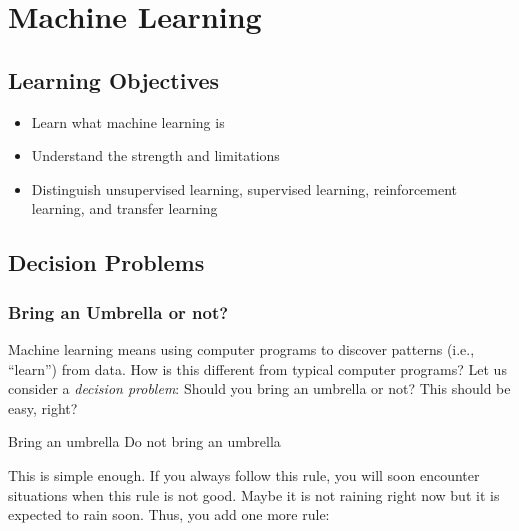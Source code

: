 \newcommand{\learnpath}{\thischapterpath}

\chapter{Machine Learning}

\section{Learning Objectives}


\begin{itemize}
\item Learn what machine learning is 
  
\item Understand the strength and limitations 
  
\item Distinguish  unsupervised learning,  supervised learning,  reinforcement learning, and transfer
  learning
\end{itemize}

\section{Decision Problems}



\subsection{Bring an Umbrella or not?}

Machine learning means using computer programs to discover patterns
(i.e., ``learn'') from data.    How is this different from typical computer programs?
Let us consider a {\it decision problem}: Should you bring an umbrella
or not?  This should be easy, right?

\begin{algorithm}
    \begin{algorithmic}[1]
      \State Bring an umbrella
      \Else
      \State Do not bring an umbrella
      \EndIf
    \end{algorithmic}
\end{algorithm}

This is simple enough.  If you always follow this rule, you will soon
encounter situations when this rule is not good.  Maybe it is not raining
right now but it is expected to rain soon. Thus, you add one more rule:

